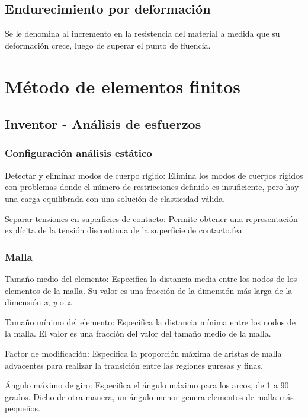 \subsection{Endurecimiento por deformación}
Se le denomina al incremento en la resistencia del material a medida que su deformación crece, luego de superar el punto de fluencia. 



\section{Método de elementos finitos}
\subsection{Inventor - Análisis de esfuerzos}

\subsubsection{Configuración análisis estático}
Detectar y eliminar modos de cuerpo rígido: Elimina los modos de cuerpos rígidos con problemas donde el número de restricciones definido es insuficiente, pero hay una carga equilibrada con una solución de elasticidad válida.

Separar tensiones en superficies de contacto: Permite obtener una representación explícita de la tensión discontinua de la superficie de contacto.fea


\subsubsection{Malla}
Tamaño medio del elemento: Especifica la distancia media entre los nodos de los elementos de la malla. Su valor es una fracción de la dimensión más larga de la dimensión \textit{x}, \textit{y} o \textit{z}.

Tamaño mínimo del elemento: Especifica la distancia mínima entre los nodos de la malla. El valor es una fracción del valor del tamaño medio de la malla.

Factor de modificación: Especifica la proporción máxima de aristas de malla adyacentes para realizar la transición entre las regiones guresas y finas.

Ángulo máximo de giro: Especifica el ángulo máximo para los arcos, de 1 a 90 grados. Dicho de otra manera, un ángulo menor genera elementos de malla más pequeños.


